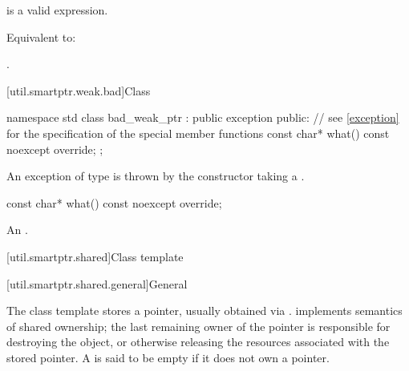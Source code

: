 \begin{itemdescr}
\pnum
\constraints
{} is a valid expression.

\pnum
\effects
Equivalent to: 

\pnum
\returns
{}.
\end{itemdescr}

[util.smartptr.weak.bad]{Class }%
%

%
\begin{codeblock}
namespace std {
  class bad_weak_ptr : public exception {
  public:
    // see \ref{exception} for the specification of the special member functions
    const char* what() const noexcept override;
  };
}
\end{codeblock}

\pnum
An exception of type  is thrown by the 
constructor taking a .

%
\begin{itemdecl}
const char* what() const noexcept override;
\end{itemdecl}

\begin{itemdescr}
\pnum
\returns
An  \ntbs{}.
\end{itemdescr}

[util.smartptr.shared]{Class template }

[util.smartptr.shared.general]{General}

\pnum
{}%
The  class template stores a pointer, usually obtained
via .  implements semantics of shared ownership;
the last remaining owner of the pointer is responsible for destroying
the object, or otherwise releasing the resources associated with the stored pointer. A
 is said to be empty if it does not own a pointer.

